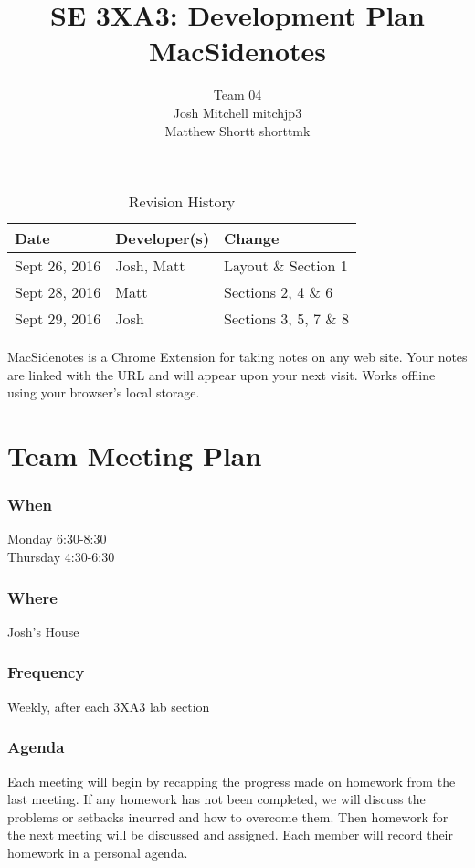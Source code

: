 \documentclass{article}
\title{SE 3XA3: Development Plan\\MacSidenotes}
\author{Team 04
	\\ Josh Mitchell mitchjp3
	\\ Matthew Shortt shorttmk
}
\date{}
\begin{document}
	
	\begin{table}[hp]
		\caption{Revision History} \label{TblRevisionHistory}
		\begin{tabularx}{\textwidth}{llX}
			\toprule
			\textbf{Date} & \textbf{Developer(s)} & \textbf{Change}\\
			\midrule
			Sept 26, 2016 & Josh, Matt & Layout \& Section 1\\
			Sept 28, 2016 & Matt & Sections 2, 4 \& 6\\
			Sept 29, 2016 & Josh & Sections 3, 5, 7 \& 8\\
			\bottomrule
		\end{tabularx}
	\end{table}
	
	\newpage
	
	\maketitle
	
	MacSidenotes is a Chrome Extension for taking notes on any web site. Your 
	notes are linked with the URL and will appear upon your next visit. Works 
	offline using your browser's local storage.
	
	\section{Team Meeting Plan}
	\subsubsection*{When}
	Monday 6:30-8:30 \\
	Thursday 4:30-6:30
	\subsubsection*{Where}
	Josh's House
	\subsubsection*{Frequency}
	Weekly, after each 3XA3 lab section
	\subsubsection*{Agenda}
	Each meeting will begin by recapping the progress made on homework from the 
	last meeting. If any homework has not been completed, we will discuss the 
	problems or setbacks incurred and how to overcome them. Then homework for 
	the next meeting will be discussed and assigned. Each member will record 
	their 
	homework in a personal agenda.
	
\end{document}
